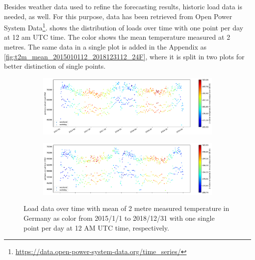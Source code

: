 Besides weather data used to refine the forecasting results, historic load data is needed, as well. For this purpose, data has been retrieved from Open Power System Data\footnote{\url{https://data.open-power-system-data.org/time_series/}}.  shows the distribution of loads over time with one point per day at 12 am UTC time. The color shows the mean temperature measured at 2 metres. The same data in a single plot is added in the Appendix as \cref{fig:t2m_mean_2015010112_2018123112_24F}, where it is split in two plots for better distinction of single points.\\


\begin{figure}[H]%
	\centering
	\begin{subfigure}{.5\textwidth}
		\centering
		\includegraphics[width=2.9\textwidth,angle=-90,origin=c]{plots/plot_load_time_func/t2m_mean_18A5_2017010112_2018123112_24F}%
		\label{fig:t2m_mean_18A5_2017010112_2018123112_24F}%
	\end{subfigure}%
	\begin{subfigure}{.5\textwidth}
		\centering
		\includegraphics[width=2.9\textwidth,angle=-90,origin=c]{plots/plot_load_time_func/t2m_mean_18A5_2015010112_2016123112_24F}%
		\label{fig:t2m_mean_18A5_2015010112_2016123112_24F}%
	\end{subfigure}
	\caption{Load data over time with mean of 2 metre measured temperature in Germany as color from 2015/1/1 to 2018/12/31 with one single point per day at 12 AM UTC time, respectively.}
	\label{fig:t2m_mean_18A5_twofold_24F}
\end{figure}


